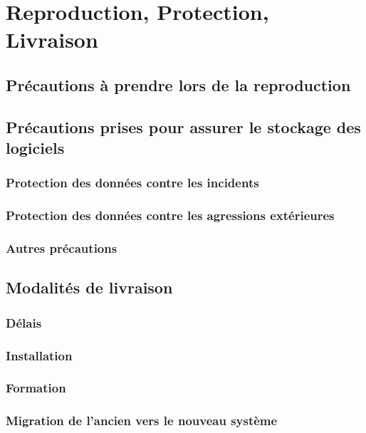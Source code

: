 \section{Reproduction, Protection, Livraison}

\subsection{Précautions à prendre lors de la reproduction}

\subsection{Précautions prises pour assurer le stockage des logiciels}

\subsubsection{Protection des données contre les incidents}

\subsubsection{Protection des données contre les agressions extérieures}

\subsubsection{Autres précautions}

\subsection{Modalités de livraison}

\subsubsection{Délais}

\subsubsection{Installation}

\subsubsection{Formation}

\subsubsection{Migration de l'ancien vers le nouveau système}
\pagebreak
